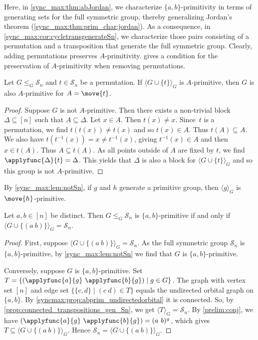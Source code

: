
Here, in \cref{sync_max:thm:abJordan},
we characterize $\{a,b\}$-primitivity 
in terms of generating sets for the full symmetric group, thereby generalizing Jordan's theorem (\cref{sync_max:thm:prim_char:jordan}).
As a consequence, in \cref{sync_max:cor:cycletransgenerateSn},
we characterize those pairs consisting of a permutation
and a transposition that generate the full symmetric group.
Clearly, adding permutations preserves $A$-primitivity.
 gives a condition for the preservation of $A$-primitivity when removing permutations.

\begin{lemma}
\label{sync_max:lem:notSn}	
	Let $G \le_G \mathcal S_n$ and $t \in \mathcal S_n$ be a permutation. 
	If $\langle G \cup \{t\} \rangle_G$
	is $A$-primitive, then $G$ is also $A$-primitive
	for $A = \move{t}$.
\end{lemma}
\begin{proof}
	Suppose $G$ is not $A$-primitive.
	Then there exists a non-trivial block $\Delta \subseteq [n]$
	such that $A \subseteq \Delta$.
	Let $x \in A$. Then $t(x) \ne x$.
	Since~$t$ is a permutation, we find $t(t(x)) \ne t(x)$
	and so $t(x) \in A$. Thus $t(A) \subseteq A$.
	We also have $t(t^{-1}(x)) = x \ne t^{-1}(x)$,
	giving $t^{-1}(x) \in A$
	and then $x \in t(A)$. Thus $A \subseteq t(A)$.
	As all points outside of $A$ are fixed by $t$,
	we find  $\applyfunc{\Delta}{t} = \Delta$.
	This yields that $\Delta$
	is also a block for $\langle G \cup \{t\} \rangle_G$
	and so this group is not $A$-primitive.
\end{proof}

By \cref{sync_max:lem:notSn}, if $g$ and $h$ generate a primitive group,
then $\langle g \rangle_G$ is $\move{h}$-primitive.

\begin{theorem}\label{sync_max:thm:abJordan}
	Let $a,b \in [n]$ be distinct.
	Then $G \le_G \mathcal S_n$ is $\{a,b\}$-primitive
	if and only if $\langle G \cup \{ (a ~ b) \} \rangle_G = \mathcal S_n$.
\end{theorem}
\begin{proof}
	First, suppose $\langle G \cup \{ (a ~ b) \} \rangle_G = \mathcal S_n$.
	As the full symmetric group $\mathcal S_n$ is $\{a,b\}$-primitive,
	by \cref{sync_max:lem:notSn} we find that $G$ is $\{a,b\}$-primitive.		
	
	Conversely, suppose $G$ is $\{a,b\}$-primitive.
	Set $T =  \{ (\applyfunc{a}{g} ~ \applyfunc{b}{g}) \mid g \in G \}$.
	The graph with vertex set $[n]$ and edge set
	$
	\{ \{c,d\} \mid (c ~ d) \in T\}
	$
	equals the undirected orbital graph on $\{a,b\}$.
	By \cref{syncmax:prop:abprim_undirectedorbital} it is connected.
	So, by \cref{prop:connected_transpositions_gen_Sn},
	we get $\langle T \rangle_G = \mathcal S_n$.
	By \cref{prelim:conj}, we have $(\applyfunc{a}{g} ~ \applyfunc{b}{g}) = (a ~ b)^g$,
	which gives $T \subseteq \langle G \cup \{ (a ~ b) \} \rangle_G$.
	Hence $\mathcal S_n = \langle G \cup \{ (a ~ b) \} \rangle_G$.		
\end{proof}

